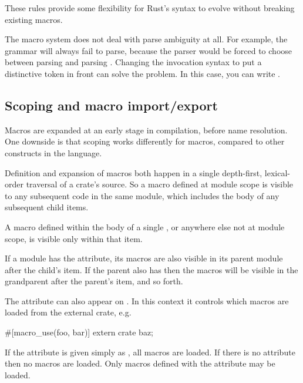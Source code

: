 These rules provide some flexibility for Rust's syntax to evolve without breaking existing macros.

\blank

The macro system does not deal with parse ambiguity at all. For example, the grammar  will always fail to 
parse, because the parser would be forced to choose between parsing  and parsing . Changing the invocation syntax to 
put a distinctive token in front can solve the problem. In this case, you can write .

\subsection*{Scoping and macro import/export}

Macros are expanded at an early stage in compilation, before name resolution. One downside is that scoping works differently for 
macros, compared to other constructs in the language.

\blank

Definition and expansion of macros both happen in a single depth-first, lexical-order traversal of a crate's source. So a macro 
defined at module scope is visible to any subsequent code in the same module, which includes the body of any subsequent child  items.

\blank

A macro defined within the body of a single , or anywhere else not at module scope, is visible only within that item.

\blank

If a module has the  attribute, its macros are also visible in its parent module after the child's  item. If 
the parent also has  then the macros will be visible in the grandparent after the parent's  item, and so forth.

\blank

The  attribute can also appear on . In this context it controls which macros are loaded from the external 
crate, e.g.

\begin{rustc}
#[macro_use(foo, bar)]
extern crate baz;
\end{rustc}

If the attribute is given simply as , all macros are loaded. If there is no  attribute then no 
macros are loaded. Only macros defined with the  attribute may be loaded.

